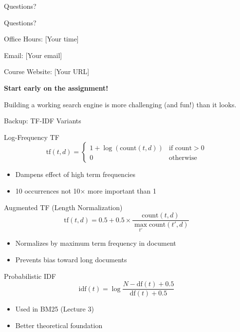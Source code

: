 \documentclass[aspectratio=169]{beamer}
\newif\ifanimated
\newcommand{\cpause}{\ifanimated\pause\fi}
\begin{document}
\begin{frame}{Questions?}
\begin{center}
\Huge Questions?

\vspace{2em}

\Large
Office Hours: [Your time]

\vspace{1em}

Email: [Your email]

\vspace{1em}

Course Website: [Your URL]

\vspace{2em}

\normalsize
\textbf{Start early on the assignment!}

\vspace{0.5em}

Building a working search engine is more challenging (and fun!) than it looks.
\end{center}
\end{frame}

\appendix

\begin{frame}[shrink=15]{Backup: TF-IDF Variants}
\begin{block}{Log-Frequency TF}
$$\text{tf}(t,d) = \begin{cases} 1 + \log(\text{count}(t,d)) & \text{if count} > 0 \\ 0 & \text{otherwise} \end{cases}$$
\begin{itemize}
    \item Dampens effect of high term frequencies
    \item 10 occurrences not 10× more important than 1
\end{itemize}
\cpause
\end{block}
\cpause
\begin{block}{Augmented TF (Length Normalization)}
$$\text{tf}(t,d) = 0.5 + 0.5 \times \frac{\text{count}(t,d)}{\max_{t'} \text{count}(t',d)}$$
\begin{itemize}
    \item Normalizes by maximum term frequency in document
    \item Prevents bias toward long documents
\end{itemize}
\cpause
\end{block}
\cpause
\begin{block}{Probabilistic IDF}
$$\text{idf}(t) = \log \frac{N - \text{df}(t) + 0.5}{\text{df}(t) + 0.5}$$
\begin{itemize}
    \item Used in BM25 (Lecture 3)
    \item Better theoretical foundation
\end{itemize}
\end{block}
\end{frame}
\end{document}
